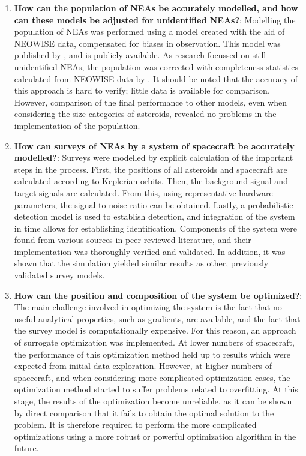 \begin{enumerate}
 \item \textbf{How can the population of NEAs be accurately modelled, and how can these models be adjusted for unidentified NEAs?}: Modelling the population of NEAs was performed using a model created with the aid of NEOWISE data, compensated for biases in observation. This model was published by \cite{GranvikPopulation}, and is publicly available. As research focussed on still unidentified NEAs, the population was corrected with completeness statistics calculated from NEOWISE data by \cite{HarrisPopulation}. It should be noted that the accuracy of this approach is hard to verify; little data is available for comparison. However, comparison of the final performance to other models, even when considering the size-categories of asteroids, revealed no problems in the implementation of the population.
 \item \textbf{How can surveys of NEAs by a system of spacecraft be accurately modelled?}: Surveys were modelled by explicit calculation of the important steps in the process. First, the positions of all asteroids and spacecraft are calculated according to Keplerian orbits. Then, the background signal and target signals are calculated. From this, using representative hardware parameters, the signal-to-noise ratio can be obtained. Lastly, a probabilistic detection model is used to establish detection, and integration of the system in time allows for establishing identification. Components of the system were found from various sources in peer-reviewed literature, and their implementation was thoroughly verified and validated. In addition, it was shown that the simulation yielded similar results as other, previously validated survey models.
 \item \textbf{How can the position and composition of the system be optimized?}: The main challenge involved in optimizing the system is the fact that no useful analytical properties, such as gradients, are available, and the fact that the survey model is computationally expensive. For this reason, an approach of surrogate optimization was implemented. At lower numbers of spacecraft, the performance of this optimization method held up to results which were expected from initial data exploration. However, at higher numbers of spacecraft, and when considering more complicated optimization cases, the optimization method started to suffer problems related to overfitting. At this stage, the results of the optimization become unreliable, as it can be shown by direct comparison that it fails to obtain the optimal solution to the problem. It is therefore required to perform the more complicated optimizations using a more robust or powerful optimization algorithm in the future.

\end{enumerate}
